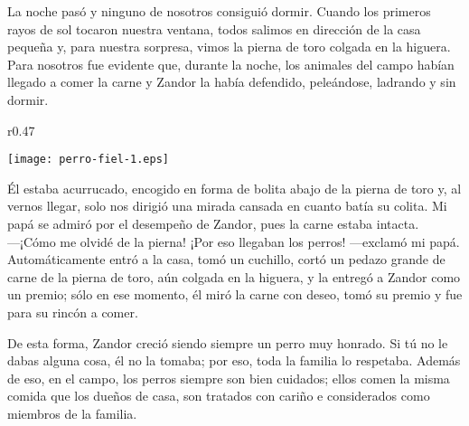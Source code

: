 La noche pasó y ninguno de nosotros consiguió dormir. 
Cuando los primeros rayos de sol tocaron nuestra ventana, todos salimos en dirección de la casa pequeña y, para nuestra sorpresa, vimos la pierna de toro colgada en la higuera. 
Para nosotros fue evidente que, durante la noche, los animales del campo habían llegado a comer la carne y Zandor la había defendido, peleándose, ladrando y sin dormir. 
\ifdefined\EnableIncludeImages
\begin{wrapfigure}{r}{0.47\textwidth}
  \begin{center}
  \vspace{-0.5cm}
    \texttt{[image: perro-fiel-1.eps]}
  \end{center}
  \vspace{-0.5cm}
\end{wrapfigure}
\fi
Él estaba acurrucado, encogido en forma de bolita abajo de la pierna de toro y, al vernos llegar, solo nos dirigió una mirada cansada en cuanto batía su colita. Mi papá se admiró por el desempeño de Zandor, pues la carne estaba intacta.\\\indent
---¡Cómo me olvidé de la pierna! ¡Por eso llegaban los perros! ---exclamó mi papá.\\\indent
Automáticamente entró a la casa, tomó un cuchillo, cortó un pedazo grande de carne de la pierna de toro, aún colgada en la higuera, y la entregó a Zandor como un premio; sólo en ese momento, él miró la carne con deseo, tomó su premio y fue para su rincón a comer.

De esta forma, Zandor creció siendo siempre un perro muy honrado. Si tú no le dabas alguna cosa, él no la tomaba; por eso, toda la familia lo respetaba. Además de eso, en el campo, los perros siempre son bien cuidados; ellos comen la misma comida que los dueños de casa, son tratados con cariño e considerados como miembros de la familia.


